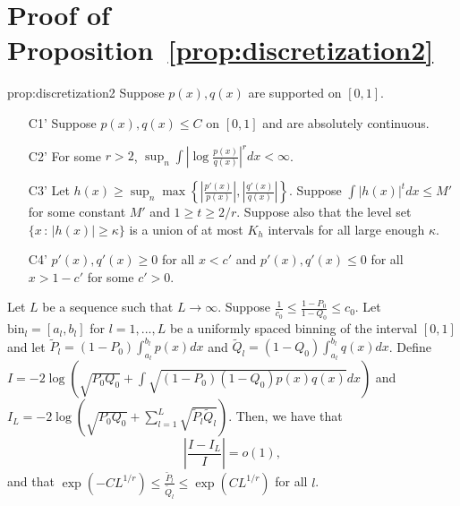 \documentclass{article}
\newcommand{\bin}{\text{bin}}
\begin{document}










\section{Proof of Proposition~\ref{prop:discretization2}}

\begin{repproposition}{prop:discretization2}
Suppose $p(x), q(x)$ are supported on $[0,1]$.

\begin{enumerate}
\item[C1'] Suppose $p(x), q(x) \leq C$ on $[0,1]$ and are absolutely continuous.
\item[C2'] For some $r > 2$, $\sup_n \int \left| \log \frac{p(x)}{q(x)} \right|^r dx < \infty$.
\item[C3'] Let $h(x) \geq \sup_n \max \left\{  \left|\frac{p'(x)}{p(x)} \right|, 
 \left|\frac{q'(x)}{q(x)}\right|  \right\} $. Suppose $\int |h(x)|^t dx \leq M'$ for some constant $M'$ and $1 \geq t \geq 2/r$. Suppose also that the level set $\{x \,:\, |h(x)| \geq \kappa\}$ is a union of at most $K_h$ intervals for all large enough $\kappa$.  
\item[C4']  $p'(x), q'(x) \geq 0$ for all $x < c'$ and $ p'(x), q'(x) \leq 0$ for all $x > 1-c'$ for some $c' > 0$. 
\end{enumerate}
Let $L$ be a sequence such that $L \rightarrow \infty$. Suppose $\frac{1}{c_0} \leq \frac{1 - P_0}{1-Q_0} \leq c_0$. Let $\bin_l = [a_l, b_l]$ for $l=1,...,L$ be a uniformly spaced binning of the interval $[0,1]$ and let $\tilde P_l = (1- P_0) \int_{a_l}^{b_l} p(x) dx$ and $\tilde Q_l = (1-Q_0)\int_{a_l}^{b_l} q(x) dx$. Define $I = -2 \log \left( \sqrt{P_0 Q_0} + \int \sqrt{(1-P_0)(1-Q_0) p(x) q(x)} dx \right)$ and $I_L = -2 \log \left( \sqrt{P_0 Q_0} + \sum_{l=1}^L \sqrt{\tilde P_l \tilde Q_l} \right)$. Then, we have that
 $$\left| \frac{I - I_L}{I} \right| = o(1),$$ 
and that $ \exp(-C L^{1/r}) \leq \frac{\tilde P_l}{\tilde Q_l} \leq \exp(C L^{1/r})$ for all $l$. 
\end{repproposition}
\end{document}
